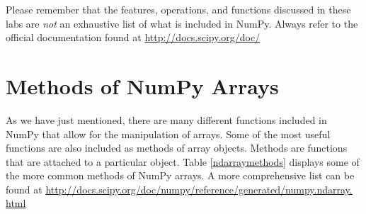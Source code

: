 Please remember that the features, operations, and functions
discussed in these labs are \emph{not} an exhaustive list
of what is included in NumPy. Always refer to the official
documentation found at \url{http://docs.scipy.org/doc/}

\section*{Methods of NumPy Arrays} 
As we have just mentioned, there are
many different functions included in NumPy that allow for the
manipulation of arrays. Some of the most useful functions are also included as
methods of array objects. Methods are functions that are 
attached to a particular object. Table \ref{ndarraymethods} displays some of 
the more common methods of NumPy arrays. A more comprehensive list can be found at
\url{http://docs.scipy.org/doc/numpy/reference/generated/numpy.ndarray.
html}

